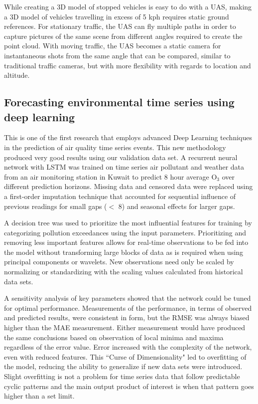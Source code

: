 While creating a 3D model of stopped vehicles is easy to do with a UAS, making a 3D model of vehicles travelling in excess of 5 kph requires static ground references. For stationary traffic, the UAS can fly multiple paths in order to capture pictures of the same scene from different angles required to create the point cloud. With moving traffic, the UAS becomes a static camera for instantaneous shots from the same angle that can be compared, similar to traditional traffic cameras, but with more flexibility with regards to location and altitude.

\subsection{Forecasting environmental time series using deep learning}
This is one of the first research that employs advanced Deep Learning techniques in the prediction of air quality time series events. This new methodology produced very good results using our validation data set. A recurrent neural network with LSTM was trained on time series air pollutant and weather data from an air monitoring station in Kuwait to predict 8 hour average O$_{3}$ over different prediction horizons. Missing data and censored data were replaced using a first-order imputation technique that accounted for sequential influence of previous readings for small gaps ($<$ 8) and seasonal effects for larger gaps. 

A decision tree was used to prioritize the most influential features for training by categorizing pollution exceedances using the input parameters. Prioritizing and removing less important features allows for real-time observations to be fed into the model without transforming large blocks of data as is required when using principal components or wavelets. New observations need only be scaled by normalizing or standardizing with the scaling values calculated from historical data sets. 

A sensitivity analysis of key parameters showed that the network could be tuned for optimal performance. Measurements of the performance, in terms of observed and predicted results, were consistent in form, but the RMSE was always biased higher than the MAE measurement. Either measurement would have produced the same conclusions based on observation of local minima and maxima regardless of the error value. Error increased with the complexity of the network, even with reduced features. This ``Curse of Dimensionality" led to overfitting of the model, reducing the ability to generalize if new data sets were introduced. Slight overfitting is not a problem for time series data that follow predictable cyclic patterns and the main output product of interest is when that pattern goes higher than a set limit.

